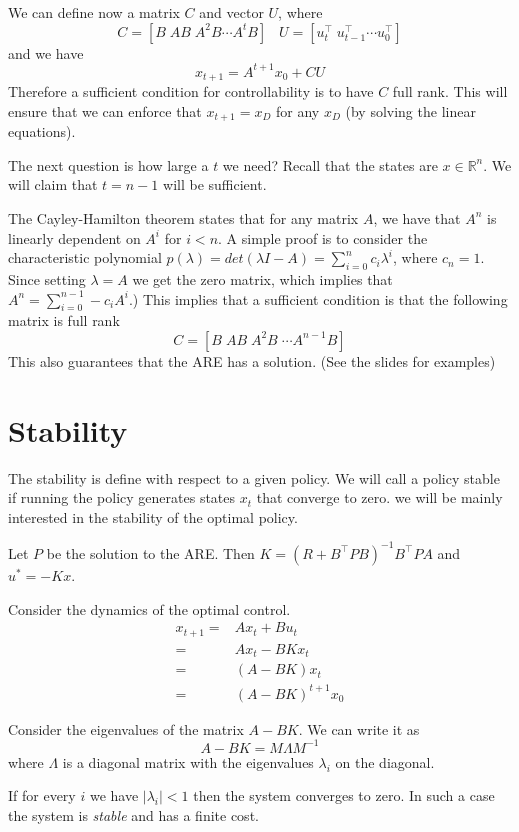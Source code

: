 We can define now a matrix $C$ and vector $U$, where
\[
C=[ B\; AB\; A^2B \cdots A^t B] \;\;\; U=[u_t^\top \;u_{t-1}^\top
\cdots u_0^\top]
\]
and we have
\[
x_{t+1}=A^{t+1}x_0 +CU
\]
Therefore a sufficient condition for controllability is to have $C$
full rank. This will ensure that we can enforce that $x_{t+1}=x_D$
for any $x_D$ (by solving the linear equations).

The next question is how large a $t$  we need? Recall that the
states are $x\in \mathbb{R}^n$. We will claim that $t=n-1$ will be
sufficient.

The Cayley-Hamilton theorem states that for any matrix $A$, we have
that $A^n$ is linearly dependent on $A^i$ for $i<n$. A simple proof is to
consider the characteristic polynomial $p(\lambda)=det(\lambda I
-A)=\sum_{i=0}^n c_i \lambda^i$, where $c_n=1$. Since setting
$\lambda=A$ we get the zero matrix, which implies that
$A^n=\sum_{i=0}^{n-1}-c_i A^i$.) This implies that a sufficient
condition is that the following matrix is full rank
\[
C=[ B\; AB\; A^2B\; \cdots A^{n-1} B]
\]
This also guarantees that the ARE has a solution. (See the slides
for examples)

\section{Stability}

The stability is define with respect to a given policy. We will call a policy stable if running the policy generates states $x_t$ that converge to zero. we will be mainly interested in the stability of the optimal policy.

Let $P$ be the solution to the ARE. Then $K=(R+B^\top P
B)^{-1}B^\top PA$ and $u^*=-Kx$.

Consider the dynamics of the optimal control.
\begin{align*}
x_{t+1} =& Ax_t + Bu_t\\
=& Ax_t -BKx_t\\
=& (A-BK)x_t\\
=&(A-BK)^{t+1}x_0
\end{align*}

Consider the eigenvalues of the matrix $A-BK$. We can write it as
\[
A-BK=M\Lambda M^{-1}
\]
where $\Lambda$ is a diagonal matrix with the eigenvalues
$\lambda_i$ on the diagonal.

If for every $i$ we have $|\lambda_i|<1$ then the system converges
to zero. In such a case the system is {\em stable} and has a finite
cost.

